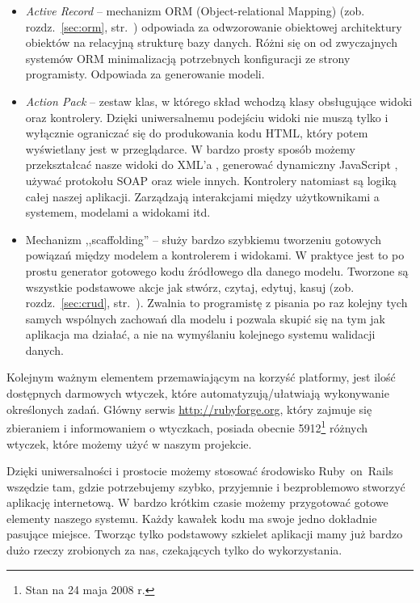 \documentclass[a4paper,12pt,oneside]{report}
\begin{document}
\begin{itemize}
\item \emph{Active Record} -- mechanizm ORM (Object-relational Mapping) (zob. rozdz.~\ref{sec:orm}, str.~\pageref{sec:orm}) odpowiada za odwzorowanie obiektowej architektury obiektów na relacyjną strukturę bazy danych. Różni się on od zwyczajnych systemów ORM minimalizacją potrzebnych konfiguracji ze strony programisty. Odpowiada za generowanie modeli.
\item \emph{Action Pack} -- zestaw klas, w którego skład wchodzą klasy obsługujące widoki oraz kontrolery. Dzięki uniwersalnemu podejściu widoki nie muszą tylko i wyłącznie ograniczać się do produkowania kodu HTML, który potem wyświetlany jest w przeglądarce. W bardzo prosty sposób możemy przekształcać nasze widoki do XML’a , generować dynamiczny JavaScript , używać protokołu SOAP oraz wiele innych. Kontrolery natomiast są logiką całej naszej aplikacji. Zarządzają interakcjami między użytkownikami a systemem, modelami a widokami itd.
\item Mechanizm ,,scaffolding'' -- służy bardzo szybkiemu tworzeniu gotowych powiązań między modelem a kontrolerem i widokami. W praktyce jest to po prostu generator gotowego kodu źródłowego dla danego modelu. Tworzone są wszystkie podstawowe akcje jak stwórz, czytaj, edytuj, kasuj (zob. rozdz.~\ref{sec:crud}, str.~\pageref{sec:crud}). Zwalnia to programistę z pisania po raz kolejny tych samych wspólnych zachowań dla modelu i pozwala skupić się na tym jak aplikacja ma działać, a nie na wymyślaniu kolejnego systemu walidacji danych.
\end{itemize}

Kolejnym ważnym elementem przemawiającym na korzyść platformy, jest ilość dostępnych darmowych wtyczek, które automatyzują/ułatwiają wykonywanie określonych zadań. Główny serwis \url{http://rubyforge.org}, który zajmuje się zbieraniem i informowaniem o wtyczkach, posiada obecnie 5912\footnote{Stan na 24 maja 2008 r.} różnych wtyczek, które możemy użyć w naszym projekcie.

Dzięki uniwersalności i prostocie możemy stosować środowisko Ruby~on~Rails wszędzie tam, gdzie potrzebujemy szybko, przyjemnie i bezproblemowo stworzyć aplikację internetową. W bardzo krótkim czasie możemy przygotować gotowe elementy naszego systemu. Każdy kawałek kodu ma swoje jedno dokładnie pasujące miejsce. Tworząc tylko podstawowy szkielet aplikacji mamy już bardzo dużo rzeczy zrobionych za nas, czekających tylko do wykorzystania.
\end{document}
